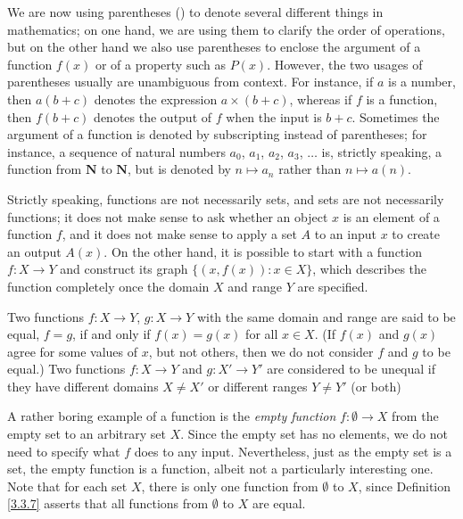 \setcounter{theorem}{4}
\begin{remark}\label{3.3.5}
    We are now using parentheses () to denote several different things in mathematics;
    on one hand, we are using them to clarify the order of operations, but on the other hand we also use parentheses to enclose the argument of a function \(f(x)\) or of a property such as \(P(x)\).
    However, the two usages of parentheses usually are unambiguous from context.
    For instance, if \(a\) is a number, then \(a(b + c)\) denotes the expression \(a \times (b + c)\), whereas if \(f\) is a function, then \(f(b + c)\) denotes the output of \(f\) when the input is \(b + c\).
    Sometimes the argument of a function is denoted by subscripting instead of parentheses;
    for instance, a sequence of natural numbers \(a_0\), \(a_1\), \(a_2\), \(a_3\), \(\dots\) is, strictly speaking, a function from \(\mathbf{N}\) to \(\mathbf{N}\), but is denoted by \(n \mapsto a_n\) rather than \(n \mapsto a(n)\).
\end{remark}

\begin{remark}\label{3.3.6}
    Strictly speaking, functions are not necessarily sets, and sets are not necessarily functions;
    it does not make sense to ask whether an object \(x\) is an element of a function \(f\), and it does not make sense to apply a set \(A\) to an input \(x\) to create an output \(A(x)\).
    On the other hand, it is possible to start with a function \(f : X \to Y\) and construct its graph \(\{(x, f(x)) : x \in X\}\), which describes the function completely once the domain \(X\) and range \(Y\) are specified.
\end{remark}

\begin{definition}\label{3.3.7}
    Two functions \(f : X \to Y\), \(g : X \to Y\) with the same domain and range are said to be equal, \(f = g\), if and only if \(f(x) = g(x)\) for all \(x \in X\).
    (If \(f(x)\) and \(g(x)\) agree for some values of \(x\), but not others, then we do not consider \(f\) and \(g\) to be equal.)
    Two functions \(f : X \to Y\) and \(g : X' \to Y'\) are considered to be unequal if they have different domains \(X \neq X'\) or different ranges \(Y \neq Y'\) (or both)
\end{definition}

\begin{note}
    A rather boring example of a function is the \emph{empty function} \(f : \emptyset \to X\) from the empty set to an arbitrary set \(X\).
    Since the empty set has no elements, we do not need to specify what \(f\) does to any input.
    Nevertheless, just as the empty set is a set, the empty function is a function, albeit not a particularly interesting one.
    Note that for each set \(X\), there is only one function from \(\emptyset\) to \(X\), since Definition \ref{3.3.7} asserts that all functions from \(\emptyset\) to \(X\) are equal.
\end{note}

